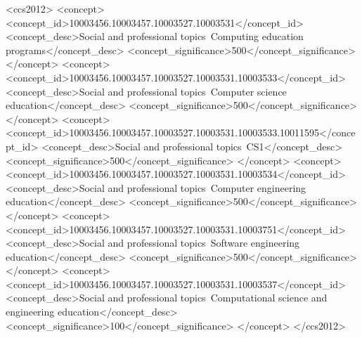\documentclass[english]{programming}
\begin{document}
 \begin{CCSXML}
<ccs2012>
<concept>
<concept_id>10003456.10003457.10003527.10003531</concept_id>
<concept_desc>Social and professional topics~Computing education programs</concept_desc>
<concept_significance>500</concept_significance>
</concept>
<concept>
<concept_id>10003456.10003457.10003527.10003531.10003533</concept_id>
<concept_desc>Social and professional topics~Computer science education</concept_desc>
<concept_significance>500</concept_significance>
</concept>
<concept>
<concept_id>10003456.10003457.10003527.10003531.10003533.10011595</concept_id>
<concept_desc>Social and professional topics~CS1</concept_desc>
<concept_significance>500</concept_significance>
</concept>
<concept>
<concept_id>10003456.10003457.10003527.10003531.10003534</concept_id>
<concept_desc>Social and professional topics~Computer engineering education</concept_desc>
<concept_significance>500</concept_significance>
</concept>
<concept>
<concept_id>10003456.10003457.10003527.10003531.10003751</concept_id>
<concept_desc>Social and professional topics~Software engineering education</concept_desc>
<concept_significance>500</concept_significance>
</concept>
<concept>
<concept_id>10003456.10003457.10003527.10003531.10003537</concept_id>
<concept_desc>Social and professional topics~Computational science and engineering education</concept_desc>
<concept_significance>100</concept_significance>
</concept>
</ccs2012>
\end{CCSXML}




\maketitle
\end{document}
